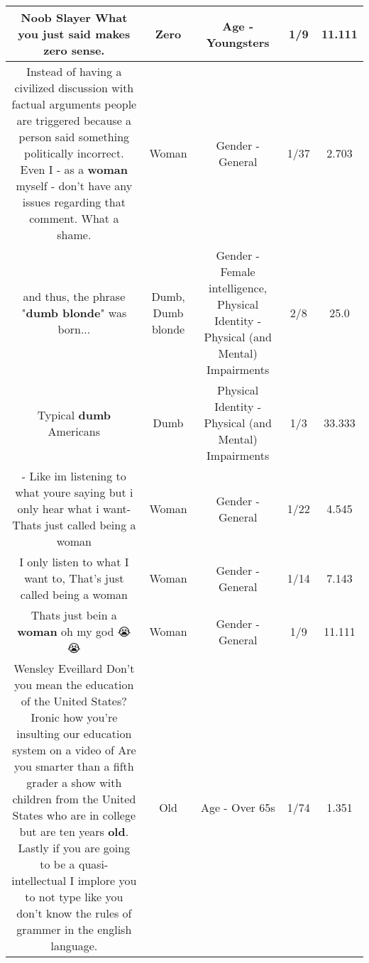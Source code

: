 \documentclass[11pt]{article}
\newlength\mylength
\begin{document}
\begin{center}
\begin{longtable}{|C{.65\mylength}|C{.30\mylength}|C{.12\mylength}|C{.12\mylength}|C{.12\mylength}|}
  \small Noob Slayer What you just said makes \textbf{zero} sense.\normalsize   & Zero & Age - Youngsters & 1/9 & 11.111 \\  \hline
  \small Instead of having a civilized discussion with factual arguments people are triggered because a person said something politically incorrect. Even I - as a \textbf{woman} myself - don't have any issues regarding that comment. What a shame.\normalsize   & Woman & Gender - General & 1/37 & 2.703 \\  \hline
  \small and thus, the phrase "\textbf{d\textbf{umb} blonde}" was born...\normalsize   & Dumb, Dumb blonde & Gender - Female intelligence, Physical Identity - Physical (and Mental) Impairments & 2/8 & 25.0 \\  \hline
  \small Typical \textbf{dumb} Americans\normalsize   & Dumb & Physical Identity - Physical (and Mental) Impairments & 1/3 & 33.333 \\  \hline
  \small - Like im listening to what youre saying but i only hear what i want- Thats just called being a woman\normalsize   & Woman & Gender - General & 1/22 & 4.545 \\  \hline
  \small I only listen to what I want to, That's just called being a woman\normalsize   & Woman & Gender - General & 1/14 & 7.143 \\  \hline
  \small Thats just bein a \textbf{woman} oh my god 😭😭\normalsize   & Woman & Gender - General & 1/9 & 11.111 \\  \hline
  \small Wensley Eveillard Don't you mean the education of the United States? Ironic how you're insulting our education system on a video of Are you smarter than a fifth grader a show with children from the United States who are in college but are ten years \textbf{old}. Lastly if you are going to be a quasi- intellectual I implore you to not type like you don't know the rules of grammer in the english language.\normalsize   & Old & Age - Over 65s & 1/74 & 1.351 \\  \hline

\end{longtable}
\end{center}
\end{document}
